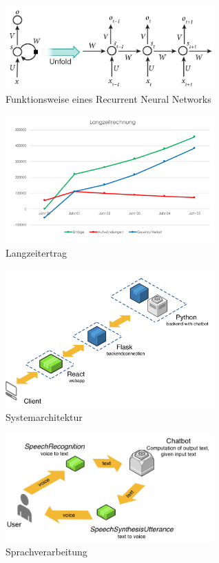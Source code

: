 \documentclass{aa}
\begin{document}
         \begin{figure}[h]
         \centering
         \includegraphics[width=8cm]{rnn.jpg}
         \caption{Funktionsweise eines Recurrent Neural Networks}
         \label{fig:rnn}
        \end{figure}
        
         \begin{figure}[h]
         \centering
         \includegraphics[width=8cm]{Langzeitertrag.png}
         \caption{Langzeitertrag}
         \label{fig:Langzeitertrag}
        \end{figure}
         
         \begin{figure}[h]
         \centering
         \includegraphics[width=8cm]{systemarchitektur_v2.png}
         \caption{Systemarchitektur}
         \label{fig:Systemarchitektur}
        \end{figure}
        
        \begin{figure}[h]
         \centering
         \includegraphics[width=8cm]{voice_v2.png}
         \caption{Sprachverarbeitung}
         \label{fig:Sprachverarbeitung}
        \end{figure}
        
\end{document}
